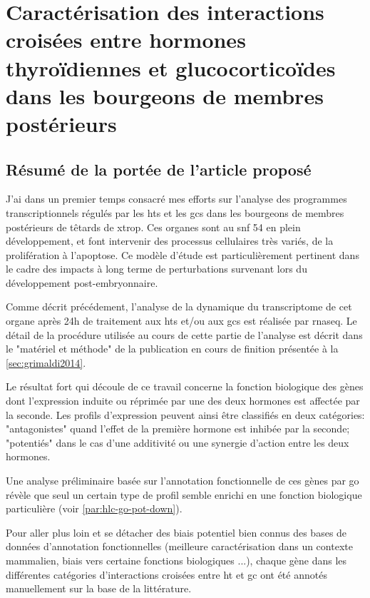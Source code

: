 \documentclass[../main.tex]{subfiles}
\begin{document}
\chapter{Caractérisation des interactions croisées entre hormones thyroïdiennes et glucocorticoïdes dans les bourgeons de membres postérieurs}



\section{Résumé de la portée de l'article proposé}

J'ai dans un premier temps consacré mes efforts sur l'analyse des programmes transcriptionnels régulés par les \glspl{ht} et les \glspl{gc} dans les bourgeons de membres postérieurs de têtards de \gls{xtrop}.
Ces organes sont au \gls{snf} 54 en plein développement, et font intervenir des processus cellulaires très variés, de la prolifération à l'apoptose.
Ce modèle d'étude est particulièrement pertinent dans le cadre des impacts à long terme de perturbations survenant lors du développement post-embryonnaire.

Comme décrit précédement, l'analyse de la dynamique du transcriptome de cet organe après 24h de traitement aux \glspl{ht} et/ou aux \glspl{gc} est réalisée par \gls{rnaseq}.
Le détail de la procédure utilisée au cours de cette partie de l'analyse est décrit dans le "matériel et méthode" de la publication en cours de finition présentée à la \autoref{sec:grimaldi2014}.

Le résultat fort qui découle de ce travail concerne la fonction biologique des gènes dont l'expression induite ou réprimée par une des deux hormones est affectée par la seconde.
Les profils d'expression peuvent ainsi être classifiés en deux catégories:
"antagonistes" quand l'effet de la première hormone est inhibée par la seconde; "potentiés" dans le cas d'une additivité ou une synergie d'action entre les deux hormones.

Une analyse préliminaire basée sur l'annotation fonctionnelle de ces gènes par \gls{go} révèle que seul un certain type de profil semble enrichi en une fonction biologique particulière (voir \autoref{par:hlc-go-pot-down}).

Pour aller plus loin et se détacher des biais potentiel bien connus des bases de données d'annotation fonctionnelles (meilleure caractérisation dans un contexte mammalien, biais vers certaine fonctions biologiques ...), chaque gène dans les différentes catégories d'interactions croisées entre \gls{ht} et \gls{gc} ont été annotés manuellement sur la base de la littérature.
\end{document}
